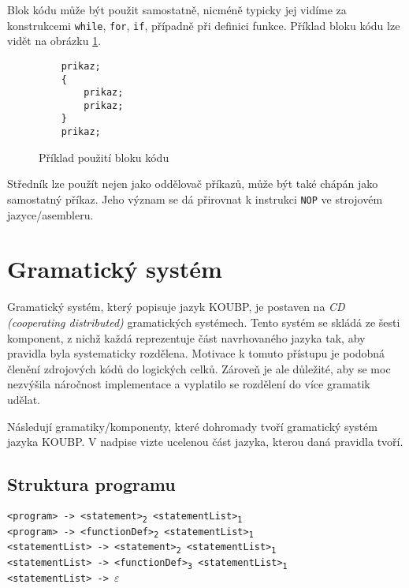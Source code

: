 \documentclass[a4paper]{article}
\begin{document}
Blok kódu může být použit samostatně, nicméně typicky jej vidíme za konstrukcemi \texttt{while}, \texttt{for}, \texttt{if}, případně při definici funkce.
Příklad bloku kódu lze vidět na obrázku \ref{fig:blok_kodu}.
\begin{figure}[ht]
	\centering
    \hspace{-1cm}
	\begin{BVerbatim}
    prikaz;
    { 
        prikaz;
        prikaz;
    }
    prikaz;
	\end{BVerbatim}
	\caption{Příklad použití bloku kódu}
	\label{fig:blok_kodu}
\end{figure}

Středník lze použít nejen jako oddělovač příkazů, může být také chápán jako samostatný příkaz.
Jeho význam se dá přirovnat k instrukci \texttt{NOP} ve strojovém jazyce/asembleru.

\section*{Gramatický systém}

Gramatický systém, který popisuje jazyk KOUBP, je postaven na \emph{CD (cooperating distributed)} gramatických systémech.
Tento systém se skládá ze šesti komponent, z nichž každá reprezentuje část navrhovaného jazyka tak, aby pravidla byla systematicky rozdělena.
Motivace k tomuto přístupu je podobná členění zdrojových kódů do logických celků.
Zároveň je ale důležité, aby se moc nezvýšila náročnost implementace a vyplatilo se rozdělení do více gramatik udělat.

Následují gramatiky/komponenty, které dohromady tvoří gramatický systém jazyka KOUBP.
V nadpise vizte ucelenou část jazyka, kterou daná pravidla tvoří.

\subsection*{Struktura programu}
\texttt{<program> -> <statement>\textsubscript{2} <statementList>\textsubscript{1}} \\
\texttt{<program> -> <functionDef>\textsubscript{2} <statementList>\textsubscript{1}} \\[1em]
\texttt{<statementList> -> <statement>\textsubscript{2} <statementList>\textsubscript{1}} \\
\texttt{<statementList> -> <functionDef>\textsubscript{3} <statementList>\textsubscript{1}} \\
\texttt{<statementList> -> }$\varepsilon$ 
\end{document}
